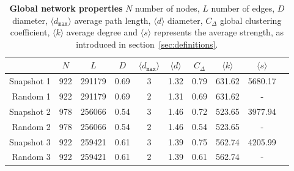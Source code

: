 \begin{table}[htbp]
\small
\centering
\caption[Global network properties]{\textbf{Global network properties} $N$ number of nodes, $L$ number of edges, $D$ diameter, $\langle d_{\texttt{max}} \rangle$ average path length, $\langle d \rangle$ diameter, $C_\Delta$ global clustering coefficient, $\langle k \rangle$ average degree and $\langle s \rangle$ represents the average strength, as introduced in section~\ref{sec:definitions}.}
\label{tab:stats}
\vspace*{5mm}
\begin{tabular}{rccccccccc}
\toprule
{} &  $N$ &   $L$ &  $D$ &  $\langle d_{\texttt{max}} \rangle$ &  $\langle d \rangle$ &   $C_\Delta$ & $\langle k \rangle$ &  $\langle s \rangle$ \\
\midrule
Snapshot 1 & 922 & 291179 & 0.69 & 3 & 1.32 &  0.79 & 631.62 & 5680.17 \\
Random 1  & 922 & 291179 & 0.69 & 2 & 1.31 &  0.69 & 631.62 & - \\ \midrule
Snapshot 2 & 978 & 256066 & 0.54 & 3 & 1.46 &  0.72 & 523.65 & 3977.94 \\
Random 2  & 978 & 256066 & 0.54 & 2 & 1.46 &  0.54 & 523.65 & - \\ \midrule
Snapshot 3 & 922 & 259421 & 0.61 & 3 & 1.39 &  0.75 & 562.74 & 4205.99 \\
Random 3  & 922 & 259421 & 0.61 & 2 & 1.39 &  0.61 & 562.74 & - \\
\bottomrule
\end{tabular}
\end{table}